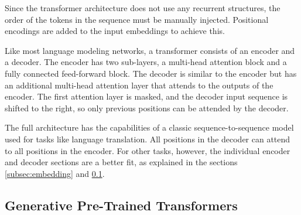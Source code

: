 \documentclass[../main.tex]{subfiles}
\begin{document}
Since the transformer architecture does not use any recurrent structures,
the order of the tokens in the sequence must be manually injected.
Positional encodings are added to the input embeddings to achieve this.

Like most language modeling networks,
a transformer consists of an encoder and a decoder.
The encoder has two sub-layers,
a multi-head attention block
and a fully connected feed-forward block.
The decoder is similar to the encoder
but has an additional multi-head attention layer
that attends to the outputs of the encoder.
The first attention layer is masked,
and the decoder input sequence is shifted to the right,
so only previous positions can be
attended by the decoder.

The full architecture has the capabilities of a classic sequence-to-sequence model
used for tasks like language translation.
All positions in the decoder can attend to all positions in the encoder.
For other tasks, however,
the individual encoder and decoder sections are a better fit,
as explained in the sections \ref{subsec:embedding} and \ref{subsec:gpt}.

\subsection{Generative Pre-Trained Transformers}
\label{subsec:gpt}
\end{document}
